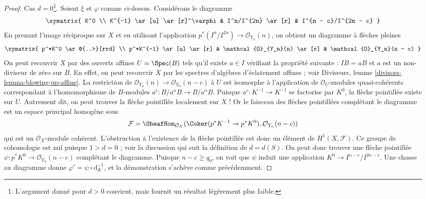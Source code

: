 \begin{proof}
\medskip\noindent
Cas $d = 0$\footnote{L'argument donné pour $d > 0$ convient, mais fournit un résultat légèrement plus faible.}. Soient $\xi$ et $\varphi$ comme ci-dessus. Considérons le diagramme
$$
\xymatrix{
K^0 \\
K^{-1} \ar[u] \ar[r]^\varphi & I^n/I^{2n} \ar[r] & I^{n - c}/I^{2n - c}
}
$$
En prenant l'image réciproque sur $X$ et en utilisant l'application $p^*(I^n/I^{2n}) \to \mathcal{O}_{Y_n}(n)$, on obtient un diagramme à flèches pleines
$$
\xymatrix{
p^*K^0 \ar@{..>}[rrd] \\
p^*K^{-1} \ar[u] \ar[r] &
\mathcal{O}_{Y_n}(n) \ar[r] &
\mathcal{O}_{Y_n}(n - c)
}
$$
On peut recouvrir $X$ par des ouverts affines $U = \Spec(B)$ tels qu'il existe $a \in I$ vérifiant la propriété suivante : $IB = aB$ et $a$ est un non-diviseur de zéro sur $B$. En effet, on peut recouvrir $X$ par les spectres d'algèbres d'éclatement affines ; voir Diviseurs, lemme \ref{divisors-lemma-blowing-up-affine}. La restriction de $\mathcal{O}_{Y_n}(n) \to \mathcal{O}_{Y_n}(n - c)$ à $U$ est isomorphe à l'application de $\mathcal{O}_U$-modules quasi-cohérents correspondant à l'homomorphisme de $B$-modules $a^c : B/a^nB \to B/a^nB$. Puisque $a^c : K^{-1} \to K^{-1}$ se factorise par $K^0$, la flèche pointillée existe sur $U$. Autrement dit, on peut trouver la flèche pointillée localement sur $X$ ! Or le faisceau des flèches pointillées complétant le diagramme est un espace principal homogène sous
$$
\mathcal{F} = \SheafHom_{\mathcal{O}_X}(
\Coker(p^*K^{-1} \to p^*K^0), \mathcal{O}_{Y_n}(n - c))
$$
qui est un $\mathcal{O}_X$-module cohérent. L'obstruction à l'existence de la flèche pointillée est donc un élément de $H^1(X, \mathcal{F})$. Ce groupe de cohomologie est nul puisque $1 > d = 0$ ; voir la discussion qui suit la définition de $d = d(S)$. On peut donc trouver une flèche pointillée $\psi : p^*K^0 \to \mathcal{O}_{Y_n}(n - c)$ complétant le diagramme. Puisque $n - c \geq q_0$, on voit que $\psi$ induit une application $K^0 \to I^{n - c}/I^{2n - c}$. Une chasse au diagramme donne $\varphi' = \psi \circ \text{d}_K^{-1}$, et la démonstration s'achève comme précédemment.
\end{proof}






\clearpage
\enlargethispage{\smallskipamount}






